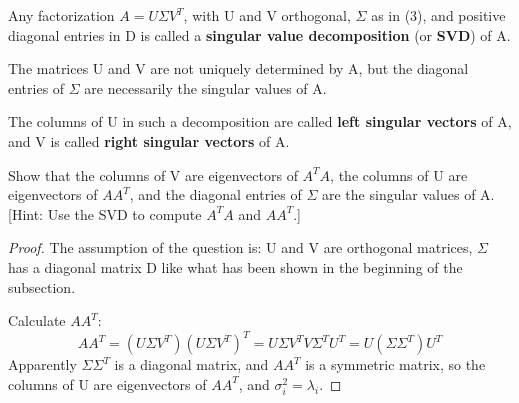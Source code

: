 \begin{definition}
    Any factorization \(A = U\Sigma V^T\), with U and V orthogonal, \(\Sigma \) as in (3), and positive diagonal entries in D is called a \textbf{singular value decomposition} (or \textbf{SVD}) of A. 
\end{definition}

The matrices U and V are not uniquely determined by A, but the diagonal entries of \(\Sigma\) are necessarily the singular values of A. 

The columns of U in such a decomposition are called \textbf{left singular vectors} of A, and V is called \textbf{right singular vectors} of A. 

\begin{problem}
    Show that the columns of V are eigenvectors of \(A^TA\), the columns of U are eigenvectors of \(AA^T\), and the diagonal entries of \(\Sigma\)  are the singular values of A.  
    [Hint: Use the SVD to compute \(A^TA\) and \(AA^T\).]
\end{problem}
\begin{proof}
    The assumption of the question is: U and V are orthogonal matrices, \(\Sigma\) has a diagonal matrix D like what has been shown in the beginning of the subsection. 

    Calculate \(AA^T\):
    \[
        AA^T = (U\Sigma V^T)(U\Sigma V^T)^T
            = U\Sigma V^T V \Sigma^T U^T
            = U (\Sigma \Sigma^T) U^T
    \] 
    Apparently \(\Sigma \Sigma^T\) is a diagonal matrix, and \(AA^T\) is a symmetric matrix, so the columns of U are eigenvectors of \(AA^T\), and \(\sigma_i^2 = \lambda_i\).  
\end{proof}
